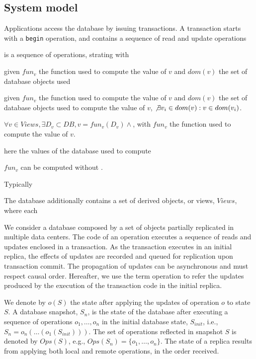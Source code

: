 \documentclass[sigplan,10pt]{acmart}
\begin{document}
\subsection{System model}


Applications access the database by issuing transactions. A transaction starts with a \texttt{begin} operation, 
and contains a sequence of read and update operations 

is a sequence of operations,
strating with %




given  $fun_v$ the function used to compute the value of $v$ and $dom(v)$ the set of database objects used



given  $fun_v$ the function used to compute the value of $v$ and $dom(v)$ the set of database objects used
to compute the value of $v$, $\not \exists v_i \in dom(v): v \in dom(v_i)$.

 
$\forall v \in Views, \exists D_v \subset DB, v = fun_v(D_v)  \wedge $, with $fun_v$ the function used to compute 
the value of $v$. 

here the values of the database used to compute 


 $fun_v$ can be computed without .


Typically 

The database additionally contains a set of derived objects, or views, $Views$, where each 

 

We consider a database composed by a set of objects partially replicated in
multiple data centers.
The code of an operation executes a sequence of reads
and updates enclosed in a transaction.
As the transaction executes in an initial replica, the effects of updates are 
recorded and queued for replication upon transaction commit.
The propagation of updates can be asynchronous and must respect causal order.
Hereafter, we use the term operation to refer the updates produced by the 
execution of the transaction code in the initial replica.

We denote by $o(S)$ the state after applying the updates of
operation $o$ to state $S$.
A database snapshot, $S_n$, is the state of the database after
executing a sequence of operations $o_1,\ldots,o_n$
in the initial database state, $S_{init}$, i.e., $S_n =
o_n(\ldots(o_1(S_{init})))$.
The set of operations reflected in snapshot $S$ is denoted by $Ops(S)$,
e.g., $Ops(S_n) = \{o_1,\ldots,o_n\}$.
The state of a replica results from applying both local and remote
operations, in the order received.
\end{document}
